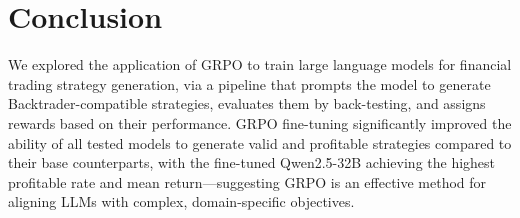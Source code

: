 \documentclass[conference,a4paper]{IEEEtran}
\begin{document}
\begin{table}[t]
  \centering
  \caption{Per-asset performance (MSFT, TSLA). Baselines from \cite{zhang2024finagent}. \textbf{Bold} = best ARR/SR per asset.}
  \label{tab:per-asset-comparison}
\end{table}

\section{Conclusion}
\label{ch:conclusion}

We explored the application of GRPO to train large language models for financial trading
strategy generation, via a pipeline that prompts the model to generate
Backtrader-compatible strategies, evaluates them by back-testing, and assigns rewards
based on their performance. GRPO fine-tuning significantly improved the
ability of all tested models to generate valid and profitable strategies compared to their
base counterparts, with the fine-tuned Qwen2.5-32B achieving the highest profitable rate
and mean return---suggesting GRPO is an effective method for aligning LLMs with complex,
domain-specific objectives.
\end{document}
